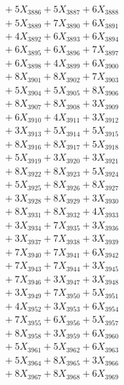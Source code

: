 \documentclass[a4paper,10pt]{article}
\begin{document}
{\begin{align}
&\;  + 5 X_{3886} + 5 X_{3887} + 6 X_{3888} \\[0.3ex]
&\;  + 5 X_{3889} + 7 X_{3890} + 6 X_{3891} \\[0.3ex]
&\;  + 4 X_{3892} + 6 X_{3893} + 6 X_{3894} \\[0.3ex]
&\;  + 6 X_{3895} + 6 X_{3896} + 7 X_{3897} \\[0.3ex]
&\;  + 6 X_{3898} + 4 X_{3899} + 6 X_{3900} \\[0.3ex]
&\;  + 8 X_{3901} + 8 X_{3902} + 7 X_{3903} \\[0.3ex]
&\;  + 5 X_{3904} + 5 X_{3905} + 8 X_{3906} \\[0.3ex]
&\;  + 8 X_{3907} + 8 X_{3908} + 3 X_{3909} \\[0.5ex]\allowbreak
&\;  + 6 X_{3910} + 4 X_{3911} + 3 X_{3912} \\[0.3ex]
&\;  + 3 X_{3913} + 5 X_{3914} + 5 X_{3915} \\[0.3ex]
&\;  + 8 X_{3916} + 8 X_{3917} + 5 X_{3918} \\[0.3ex]
&\;  + 5 X_{3919} + 3 X_{3920} + 3 X_{3921} \\[0.3ex]
&\;  + 8 X_{3922} + 8 X_{3923} + 5 X_{3924} \\[0.3ex]
&\;  + 5 X_{3925} + 8 X_{3926} + 8 X_{3927} \\[0.3ex]
&\;  + 3 X_{3928} + 8 X_{3929} + 3 X_{3930} \\[0.3ex]
&\;  + 8 X_{3931} + 8 X_{3932} + 4 X_{3933} \\[0.3ex]
&\;  + 3 X_{3934} + 7 X_{3935} + 3 X_{3936} \\[0.3ex]
&\;  + 3 X_{3937} + 7 X_{3938} + 3 X_{3939} \\[0.5ex]\allowbreak
&\;  + 7 X_{3940} + 7 X_{3941} + 6 X_{3942} \\[0.3ex]
&\;  + 7 X_{3943} + 7 X_{3944} + 3 X_{3945} \\[0.3ex]
&\;  + 7 X_{3946} + 3 X_{3947} + 3 X_{3948} \\[0.3ex]
&\;  + 3 X_{3949} + 7 X_{3950} + 5 X_{3951} \\[0.3ex]
&\;  + 4 X_{3952} + 3 X_{3953} + 6 X_{3954} \\[0.3ex]
&\;  + 7 X_{3955} + 6 X_{3956} + 5 X_{3957} \\[0.3ex]
&\;  + 8 X_{3958} + 3 X_{3959} + 6 X_{3960} \\[0.3ex]
&\;  + 5 X_{3961} + 5 X_{3962} + 6 X_{3963} \\[0.3ex]
&\;  + 5 X_{3964} + 8 X_{3965} + 3 X_{3966} \\[0.3ex]
&\;  + 8 X_{3967} + 8 X_{3968} + 6 X_{3969} \\[0.5ex]\allowbreak

\end{align}}
\end{document}
